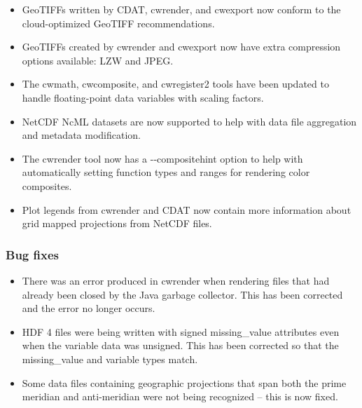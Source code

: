 \begin{itemize}
  
  \item GeoTIFFs written by CDAT, cwrender, and cwexport now conform to the
  cloud-optimized GeoTIFF recommendations.
  
  \item GeoTIFFs created by cwrender and cwexport now have extra compression
  options available: LZW and JPEG.

  \item The cwmath, cwcomposite, and cwregister2 tools have been updated to
  handle floating-point data variables with scaling factors.

  \item NetCDF NcML datasets are now supported to help with data file
  aggregation and metadata modification.

  \item The cwrender tool now has a -{-}compositehint option to help with
  automatically setting function types and ranges for rendering color composites.
  
  \item Plot legends from cwrender and CDAT now contain more information
  about grid mapped projections from NetCDF files.
  
\end{itemize}

\subsubsection*{ Bug fixes}
\begin{itemize}

  \item There was an error produced in cwrender when rendering files that had
  already been closed by the Java garbage collector.  This has been corrected
  and the error no longer occurs.

  \item HDF 4 files were being written with signed missing\_value attributes
  even when the variable data was unsigned.  This has been corrected so that
  the missing\_value and variable types match.

  \item Some data files containing geographic projections that span both the
  prime meridian and anti-meridian were not being recognized -- this is now
  fixed.
  
\end{itemize}

